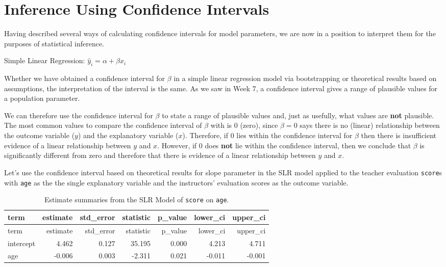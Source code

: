 \documentclass[]{article}
\begin{document}
\newpage

\section{Inference Using Confidence
Intervals}\label{inference-using-confidence-intervals}

Having described several ways of calculating confidence intervals for
model parameters, we are now in a position to interpret them for the
purposes of statistical inference.

Simple Linear Regression: \(\hat{y}_i = \alpha + \beta x_i\)

Whether we have obtained a confidence interval for \(\beta\) in a simple
linear regression model via bootstrapping or theoretical results based
on assumptions, the interpretation of the interval is the same. As we
saw in Week 7, a confidence interval gives a range of plausible values
for a population parameter.

We can therefore use the confidence interval for \(\beta\) to state a
range of plausible values and, just as usefully, what values are
\textbf{not} plausible. The most common values to compare the confidence
interval of \(\beta\) with is 0 (zero), since \(\beta = 0\) says there
is no (linear) relationship between the outcome variable (\(y\)) and the
explanatory variable (\(x\)). Therefore, if 0 lies within the confidence
interval for \(\beta\) then there is insufficient evidence of a linear
relationship between \(y\) and \(x\). However, if 0 does \textbf{not}
lie within the confidence interval, then we conclude that \(\beta\) is
significantly different from zero and therefore that there is evidence
of a linear relationship between \(y\) and \(x\).

Let's use the confidence interval based on theoretical results for slope
parameter in the SLR model applied to the teacher evaluation
\texttt{score}s with \texttt{age} as the the single explanatory variable
and the instructors' evaluation scores as the outcome variable.

\begin{longtable}[]{@{}lrrrrrr@{}}
\caption{Estimate summaries from the SLR Model of \texttt{score} on
\texttt{age}.}\tabularnewline
\toprule
term & estimate & std\_error & statistic & p\_value & lower\_ci &
upper\_ci\tabularnewline
\midrule
\endfirsthead
\toprule
term & estimate & std\_error & statistic & p\_value & lower\_ci &
upper\_ci\tabularnewline
\midrule
\endhead
intercept & 4.462 & 0.127 & 35.195 & 0.000 & 4.213 &
4.711\tabularnewline
age & -0.006 & 0.003 & -2.311 & 0.021 & -0.011 & -0.001\tabularnewline
\bottomrule
\end{longtable}
\end{document}
